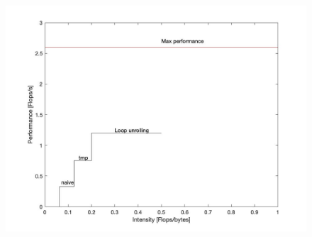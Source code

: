 \documentclass{beamer}
\begin{document}
\begin{frame}
\begin{figure}
\includegraphics[scale=0.25]{fig_ok}
\end{figure}
\end{frame}

\end{document}
